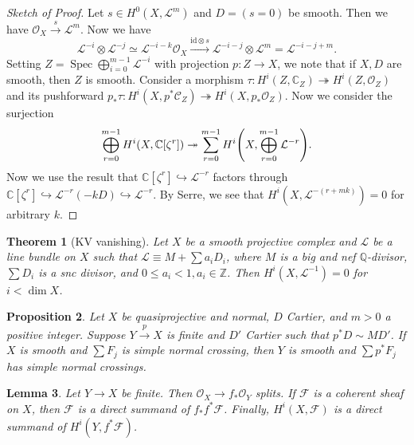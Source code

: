 \documentclass[leqno, openany]{memoir}
\newtheorem{thm}{Theorem}[section]
\newtheorem{prop}[thm]{Proposition}
\newtheorem{lem}[thm]{Lemma}
\theoremstyle{definition}
\theoremstyle{remark}
\theoremstyle{plain}
\theoremstyle{definition}
\theoremstyle{remark}
\newcommand{\C}{\mathbb{C}}
\newcommand{\Z}{\mathbb{Z}}
\newcommand{\Q}{\mathbb{Q}}
\newcommand{\mc}[1]{\mathcal{#1}}
\newcommand{\mr}[1]{\mathrm{#1}}
\DeclareMathOperator{\Spec}{Spec}
\begin{document}
\begin{proof}[Sketch of Proof]
    Let $s \in H^0(X, \mc{L}^m)$ and $D = (s=0)$ be smooth. Then we have $\mc{O}_X \xrightarrow{s} \mc{L}^m$. Now we have
    \[ \mc{L}^{-i} \otimes \mc{L}^{-j} \simeq \mc{L}^{-i-k} \mc{O}_X \xrightarrow{\mr{id} \otimes s} \mc{L}^{-i-j} \otimes \mc{L}^m = \mc{L}^{-i-j+m}. \]
    Setting $Z = \Spec \bigoplus_{i=0}^{m-1} \mc{L}^{-i}$ with projection $p \colon Z \to X$, we note that if $X, D$ are smooth, then $Z$ is smooth. Consider a morphism $\tau \colon H^i(Z, \C_Z) \twoheadrightarrow H^i(Z, \mc{O}_Z)$ and its pushforward $p_* \tau \colon H^i(X, p^* \mc{C}_Z) \twoheadrightarrow H^i(X, p_* \mc{O}_Z)$. Now we consider the surjection
    \[ \bigoplus_{r=0}^{m-1} H^i(X, \C[\zeta^r]) \twoheadrightarrow \sum_{r=0}^{m-1} H^i\qty(X, \bigoplus_{r=0}^{m-1} \mc{L}^{-r}). \]
    Now we use the result that $\C[\zeta^r] \hookrightarrow \mc{L}^{-r}$ factors through $\C[\zeta^r] \hookrightarrow \mc{L}^{-r}(-k D) \hookrightarrow \mc{L}^{-r}$. By Serre, we see that $H^i(X, \mc{L}^{-(r+mk)}) = 0$ for arbitrary $k$.
\end{proof}

\begin{thm}[KV vanishing]
    Let $X$ be a smooth projective complex and $\mc{L}$ be a line bundle on $X$ such that $\mc{L} \equiv M + \sum a_i D_i$, where $M$ is a big and nef $\Q$-divisor, $\sum D_i$ is a snc divisor, and $0 \leq a_i < 1, a_i \in \Z$. Then $H^i(X, \mc{L}^{-1}) = 0$ for $i < \dim X$.
\end{thm}

\begin{prop}
    Let $X$ be quasiprojective and normal, $D$ Cartier, and $m > 0$ a positive integer. Suppose $Y \xrightarrow{p} X$ is finite and $D'$ Cartier such that $p^* D \sim MD'$. If $X$ is smooth and $\sum F_j$ is simple normal crossing, then $Y$ is smooth and $\sum p^* F_j$ has simple normal crossings.
\end{prop}

\begin{lem}
    Let $Y \to X$ be finite. Then $\mc{O}_X \to f_* \mc{O}_Y$ splits. If $\mc{F}$ is a coherent sheaf on $X$, then $\mc{F}$ is a direct summand of $f_* f^* \mc{F}$. Finally, $H^i(X, \mc{F})$ is a direct summand of $H^i(Y, f^* \mc{F})$.
\end{lem}
\end{document}
